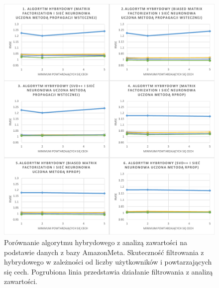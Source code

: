 \documentclass[twoside]{iisthesis}
\begin{document}
\begin{figure}[!ht]
	\centering
	\includegraphics[page=2,width=1\textwidth]{exphybrid_amazon1}
	\caption{Porównanie algorytmu hybrydowego z analizą zawartości na podstawie danych z bazy AmazonMeta. Skuteczność filtrowania z hybrydowego w zależności od liczby użytkowników i powtarzających się cech. Pogrubiona linia przedstawia działanie filtrowania z analizą zawartości.}
	\label{fig:exphybrid_amazon1b}
\end{figure}

\end{document}
